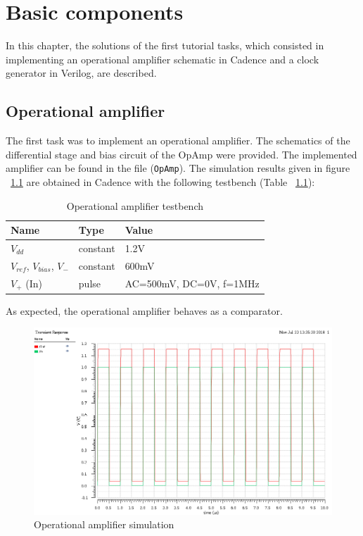 \chapter{Basic components}

In this chapter, the solutions of the first tutorial tasks, which consisted in implementing an operational amplifier schematic in Cadence and a clock generator in Verilog, are described.

\section{Operational amplifier}

The first task was to implement an operational amplifier. The schematics of the differential stage and bias circuit of the OpAmp were provided. The implemented amplifier can be found in the file (\texttt{OpAmp}). The simulation results given in figure ~\ref{fig:opAmpSimulation} are obtained in Cadence with the following testbench (Table 
~\ref{table:opAmpTestbench}): 

\begin{table}[!h]
	\centering
	\begin{tabular}{|l|l|l|}
		\hline
		Name & Type & Value \\
		\hline
		$V_{dd}$ & constant & 1.2V \\
		$V_{ref}$, $V_{bias}$, $V_{-}$ & constant & 600mV \\
		$V_{+}$ (In) & pulse & AC=500mV, DC=0V, f=1MHz \\
		\hline
	\end{tabular}
	\caption{Operational amplifier testbench}
	\label{table:opAmpTestbench}
\end{table}

As expected, the operational amplifier behaves as a comparator.

\begin{figure}[h]
	\centering
	\includegraphics[scale=0.65]{images/BasicComponents/Task1OpAmpSimulation.png}
	\caption{Operational amplifier simulation}
	\label{fig:opAmpSimulation}
\end{figure} 

